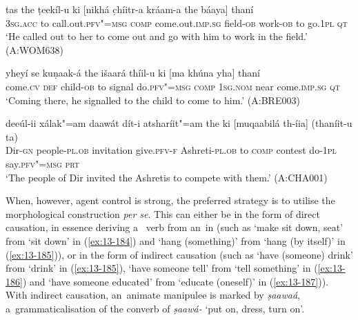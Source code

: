 \begin{exe}
\ex
\label{ex:13-181}
\gll tas the ṭeekíl-u ki [nikhá c̣híitr-a  kráam-a the báaya] thaní \\
\textsc{3sg.acc} to call.out.\textsc{pfv"=msg} \textsc{comp} come.out.\textsc{imp.sg} field-\textsc{ob}  work-\textsc{ob} to go.\textsc{1pl} \textsc{qt} \\
\glt `He called out to her to come out and go with him to work in the field.' (A:WOM638)

\ex
\label{ex:13-182}
\gll yheyí se kuṇaak-á the išaará thíil-u  ki [ma khúna yha] thaní \\
come.\textsc{cv} \textsc{def} child-\textsc{ob} to signal do.\textsc{pfv"=msg} \textsc{comp} \textsc{1sg.nom} near come.\textsc{imp.sg} \textsc{qt} \\
\glt `Coming there, he signalled to the child to come to him.' (A:BRE003)

\ex
\label{ex:13-183}
\gll deeúl-ii xálak"=am daawát dít-i  atsharíit"=am the ki [muqaabilá
  th-íia]  (thaníit-u ta) \\
Dir-\textsc{gn}  people-\textsc{pl.ob} invitation give.\textsc{pfv-f} Ashreti-\textsc{pl.ob} to \textsc{comp} contest do-\textsc{1pl} say.\textsc{pfv"=msg} \textsc{prt} \\
\glt `The people of Dir invited the Ashretis to compete with them.' (A:CHA001) 
\end{exe}

When, however, agent control is strong, the preferred strategy is to utilise the morphological  construction \textit{per se}. This can either be in the form of direct causation, in essence deriving a~ verb from an~in (such as `make sit down, seat' from `sit down' in (\ref{ex:13-184}) and `hang (something)' from `hang (by itself)' in (\ref{ex:13-185})), or in the form of indirect causation (such as `have (someone) drink' from `drink' in (\ref{ex:13-185}), `have someone tell' from `tell something' in (\ref{ex:13-186}) and `have someone educated' from `educate (oneself)' in (\ref{ex:13-187})). With indirect causation, an~animate manipulee is marked by \textit{ṣaawaá}, a~grammaticalisation of the converb of \textit{ṣaawá-} `put on, dress, turn on'.

